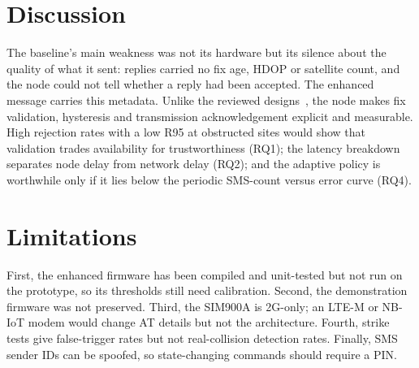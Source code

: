 \documentclass[conference]{IEEEtran}
\begin{document}

\section{Discussion}\label{sec:disc}
The baseline's main weakness was not its hardware but its silence about the quality of what it sent: replies carried no fix age, HDOP or satellite count, and the node could not tell whether a reply had been accepted. The enhanced message carries this metadata. Unlike the reviewed designs~\cite{morallo2021,moumen2023,divi2023,perusomula2023,alvarico2024}, the node makes fix validation, hysteresis and transmission acknowledgement explicit and measurable. High rejection rates with a low R95 at obstructed sites would show that validation trades availability for trustworthiness (RQ1); the latency breakdown separates node delay from network delay (RQ2); and the adaptive policy is worthwhile only if it lies below the periodic SMS-count versus error curve (RQ4).

\section{Limitations}
First, the enhanced firmware has been compiled and unit-tested but not run on the prototype, so its thresholds still need calibration. Second, the demonstration firmware was not preserved. Third, the SIM900A is 2G-only; an LTE-M or NB-IoT modem would change AT details but not the architecture. Fourth, strike tests give false-trigger rates but not real-collision detection rates. Finally, SMS sender IDs can be spoofed, so state-changing commands should require a PIN.
\end{document}
